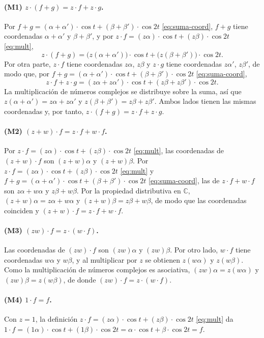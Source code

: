 \paragraph{(M1) $z\cdot(f+g)=z\cdot f+z\cdot g$.}
Por $f+g=(\alpha+\alpha')\cdot\cos t+(\beta+\beta')\cdot\cos 2t$ \eqref{eq:suma-coord}, $f+g$ tiene coordenadas $\alpha+\alpha'$ y $\beta+\beta'$, y por
$z\cdot f=(z\alpha)\cdot\cos t+(z\beta)\cdot\cos 2t$ \eqref{eq:mult},
\[
  z\cdot(f+g)=\bigl(z(\alpha+\alpha')\bigr)\cdot\cos t
  +\bigl(z(\beta+\beta')\bigr)\cdot\cos 2t .
\]
Por otra parte, $z\cdot f$ tiene coordenadas $z\alpha$, $z\beta$ y $z\cdot g$ tiene
coordenadas $z\alpha'$, $z\beta'$, de modo que, por $f+g=(\alpha+\alpha')\cdot\cos t+(\beta+\beta')\cdot\cos 2t$ \eqref{eq:suma-coord},
\[
  z\cdot f+z\cdot g=(z\alpha+z\alpha')\cdot\cos t+(z\beta+z\beta')\cdot\cos 2t .
\]
La multiplicación de números complejos se distribuye sobre la suma, así que
$z(\alpha+\alpha')=z\alpha+z\alpha'$ y $z(\beta+\beta')=z\beta+z\beta'$. Ambos lados tienen las
mismas coordenadas y, por tanto, $z\cdot(f+g)=z\cdot f+z\cdot g$.

\paragraph{(M2) $(z+w)\cdot f=z\cdot f+w\cdot f$.}
Por $z\cdot f=(z\alpha)\cdot\cos t+(z\beta)\cdot\cos 2t$ \eqref{eq:mult}, las coordenadas de $(z+w)\cdot f$ son $(z+w)\alpha$ y $(z+w)\beta$. Por
$z\cdot f=(z\alpha)\cdot\cos t+(z\beta)\cdot\cos 2t$ \eqref{eq:mult} y $f+g=(\alpha+\alpha')\cdot\cos t+(\beta+\beta')\cdot\cos 2t$ \eqref{eq:suma-coord}, las de $z\cdot f+w\cdot f$ son $z\alpha+w\alpha$ y
$z\beta+w\beta$. Por la propiedad distributiva en $\mathbb C$, $(z+w)\alpha=z\alpha+w\alpha$ y
$(z+w)\beta=z\beta+w\beta$, de modo que las coordenadas coinciden y
$(z+w)\cdot f=z\cdot f+w\cdot f$.

\paragraph{(M3) $(zw)\cdot f=z\cdot(w\cdot f)$.}
Las coordenadas de $(zw)\cdot f$ son $(zw)\alpha$ y $(zw)\beta$. Por otro lado, $w\cdot f$ tiene
coordenadas $w\alpha$ y $w\beta$, y al multiplicar por $z$ se obtienen $z(w\alpha)$ y
$z(w\beta)$. Como la multiplicación de números complejos es asociativa,
$(zw)\alpha=z(w\alpha)$ y $(zw)\beta=z(w\beta)$, de donde $(zw)\cdot f=z\cdot(w\cdot f)$.

\paragraph{(M4) $1\cdot f=f$.}
Con $z=1$, la definición $z\cdot f=(z\alpha)\cdot\cos t+(z\beta)\cdot\cos 2t$ \eqref{eq:mult} da
$1\cdot f=(1\alpha)\cdot\cos t+(1\beta)\cdot\cos 2t=\alpha\cdot\cos t+\beta\cdot\cos 2t=f$.


